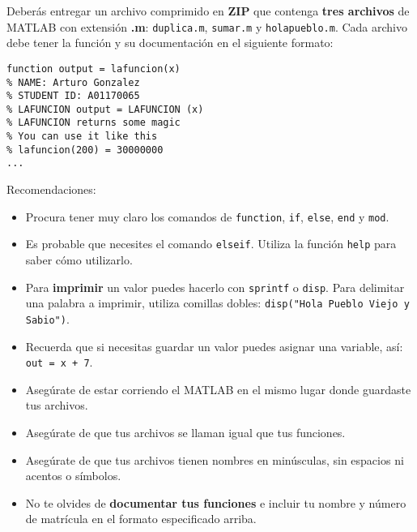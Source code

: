 \documentclass[]{book}
\newcommand{\matlab}[1]{\lstinline[style=Matlab-pyglike]!#1!}
\theoremstyle{definition}
\begin{document}
\bigskip

Deberás entregar un archivo comprimido en \textbf{ZIP} que contenga \textbf{tres archivos} de MATLAB con extensión \textbf{.m}: \texttt{duplica.m}, \texttt{sumar.m} y \texttt{holapueblo.m}.
Cada archivo debe tener la función y su documentación en el siguiente formato:

\bigskip

\begin{lstlisting}[style=Matlab-editor]
function output = lafuncion(x)
% NAME: Arturo Gonzalez
% STUDENT ID: A01170065
% LAFUNCION output = LAFUNCION (x)
% LAFUNCION returns some magic
% You can use it like this
% lafuncion(200) = 30000000
...
\end{lstlisting}

\pagebreak

{\Large Recomendaciones:}
\begin{itemize}
    \item Procura tener muy claro los comandos de \matlab{function}, \matlab{if}, \matlab{else}, \matlab{end} y \matlab{mod}.
    \item Es probable que necesites el comando \matlab{elseif}. Utiliza la función \matlab{help} para saber cómo utilizarlo.
    \item Para \textbf{imprimir} un valor puedes hacerlo con \matlab{sprintf} o \matlab{disp}. Para delimitar una palabra a imprimir, utiliza comillas dobles: \matlab{disp("Hola Pueblo Viejo y Sabio")}.
    \item Recuerda que si necesitas guardar un valor puedes asignar una variable, así: \matlab{out = x + 7}.
    \item Asegúrate de estar corriendo el MATLAB en el mismo lugar donde guardaste tus archivos.
    \item Asegúrate de que tus archivos se llaman igual que tus funciones.
    \item Asegúrate de que tus archivos tienen nombres en minúsculas, sin espacios ni acentos o símbolos. 
    \item No te olvides de \textbf{documentar tus funciones} e incluir tu nombre y número de matrícula en el formato especificado arriba.
\end{itemize}
\end{document}

